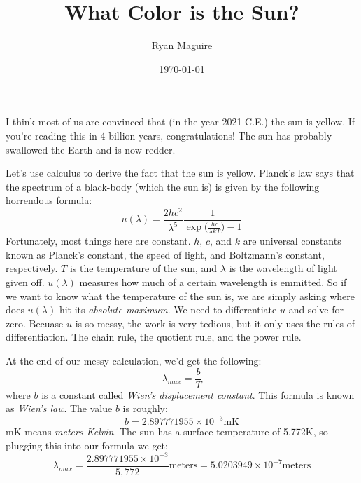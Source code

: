 \documentclass{article}
\title{What Color is the Sun?}
\author{Ryan Maguire}
\date{\today}
\begin{document}
    \maketitle
    I think most of us are convinced that (in the year 2021 C.E.) the sun
    is yellow. If you're reading this in 4 billion years, congratulations! The
    sun has probably swallowed the Earth and is now redder.
    \par\hfill\par
    Let's use calculus to derive the fact that the sun is yellow. Planck's
    law says that the spectrum of a black-body (which the sun is) is given by
    the following horrendous formula:
    \begin{equation}
        u(\lambda)=
            \frac{2hc^{2}}{\lambda^{5}}
                \frac{1}{\exp\big(\frac{hc}{\lambda{k}T})-1}
    \end{equation}
    Fortunately, most things here are constant. $h$, $c$, and $k$ are universal
    constants known as Planck's constant, the speed of light, and
    Boltzmann's constant, respectively. $T$ is the temperature of the sun,
    and $\lambda$ is the wavelength of light given off. $u(\lambda)$ measures
    how much of a certain wavelength is emmitted. So if we want to know what
    the temperature of the sun is, we are simply asking where does $u(\lambda)$
    hit its \textit{absolute maximum}. We need to differentiate $u$ and solve
    for zero. Becuase $u$ is so messy, the work is very tedious, but it only
    uses the rules of differentiation. The chain rule, the quotient rule, and
    the power rule.
    \par\hfill\par
    At the end of our messy calculation, we'd get the following:
    \begin{equation}
        \lambda_{max}=\frac{b}{T}
    \end{equation}
    where $b$ is a constant called
    \textit{Wien's displacement constant}. This formula is known as
    \textit{Wien's law}. The value $b$ is roughly:
    \begin{equation}
        b=2.897771955\times{10}^{-3}\textrm{mK}
    \end{equation}
    mK means \textit{meters-Kelvin}. The sun has a surface temperature of
    5,772K, so plugging this into our formula we get:
    \begin{equation}
        \lambda_{max}=\frac{2.897771955\times{10}^{-3}}{5,772}\textrm{meters}
            =5.0203949\times{10}^{-7}\textrm{meters}
    \end{equation}
\end{document}

